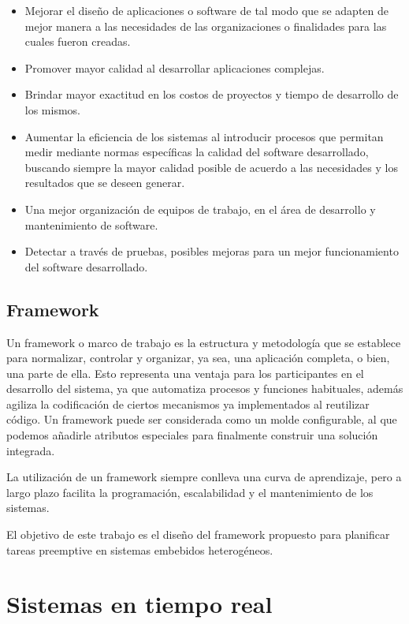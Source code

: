 \begin{itemize}
\item Mejorar el diseño de aplicaciones o software de tal modo que se adapten de mejor manera a las necesidades de las organizaciones o finalidades para las cuales fueron creadas.
\item Promover mayor calidad al desarrollar aplicaciones complejas.
\item Brindar mayor exactitud en los costos de proyectos y tiempo de desarrollo de los mismos.
\item Aumentar la eficiencia de los sistemas al introducir procesos que permitan medir mediante normas específicas la calidad del software desarrollado, buscando siempre la mayor calidad posible de acuerdo a  las necesidades y los resultados que se deseen generar.
\item Una mejor organización de equipos de trabajo, en el área de desarrollo y mantenimiento de software.
\item Detectar a través de pruebas, posibles mejoras para un mejor funcionamiento del software desarrollado.
\end{itemize} 

     \subsection{Framework}
Un framework o marco de trabajo es la estructura y metodología que se establece para normalizar, controlar y organizar, ya sea, una aplicación completa, o bien, una parte de ella. 
Esto representa una ventaja para los participantes en el desarrollo del sistema, ya que automatiza procesos y funciones habituales, además agiliza la codificación de ciertos mecanismos ya implementados al reutilizar código.
Un framework puede ser considerada como un molde configurable, al que podemos añadirle atributos especiales para finalmente construir una solución integrada.
\newline

La utilización de un framework siempre conlleva una curva de aprendizaje, pero a largo plazo facilita la programación, escalabilidad y el mantenimiento de los sistemas.
\newline

El objetivo de este trabajo es el diseño del framework propuesto para planificar tareas preemptive en sistemas embebidos heterogéneos.
		
    \section{Sistemas en tiempo real}\label{sec:sistr}

